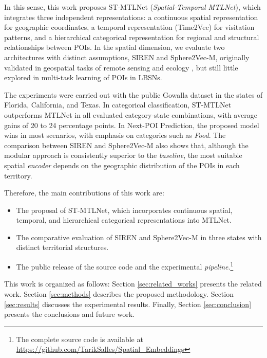 In this sense, this work proposes ST-MTLNet (\textit{Spatial-Temporal MTLNet}), which integrates three independent representations: a continuous spatial representation for geographic coordinates, a temporal representation (Time2Vec) for visitation patterns, and a hierarchical categorical representation for regional and structural relationships between POIs. In the spatial dimension, we evaluate two architectures with distinct assumptions, SIREN and Sphere2Vec-M, originally validated in geospatial tasks of remote sensing and ecology \cite{wu2024torchspatial}, but still little explored in multi-task learning of POIs in LBSNs.

The experiments were carried out with the public Gowalla dataset \cite{jure2014snap} in the states of Florida, California, and Texas. In categorical classification, ST-MTLNet outperforms MTLNet in all evaluated category-state combinations, with average gains of 20 to 24 percentage points. In Next-POI Prediction, the proposed model wins in most scenarios, with emphasis on categories such as \textit{Food}. The comparison between SIREN and Sphere2Vec-M also shows that, although the modular approach is consistently superior to the \textit{baseline}, the most suitable spatial \textit{encoder} depends on the geographic distribution of the POIs in each territory.

Therefore, the main contributions of this work are:
\begin{itemize}
\item The proposal of ST-MTLNet, which incorporates continuous spatial, temporal, and hierarchical categorical representations into MTLNet.

\item The comparative evaluation of SIREN and Sphere2Vec-M in three states with distinct territorial structures.

\item The public release of the source code and the experimental \textit{pipeline}.\footnote{The complete source code is available at \url{https://github.com/TarikSalles/Spatial_Embeddings}}
\end{itemize}

This work is organized as follows: Section \ref{sec:related_works} presents the related work. Section \ref{sec:methods} describes the proposed methodology. Section \ref{sec:results} discusses the experimental results. Finally, Section \ref{sec:conclusion} presents the conclusions and future work.
